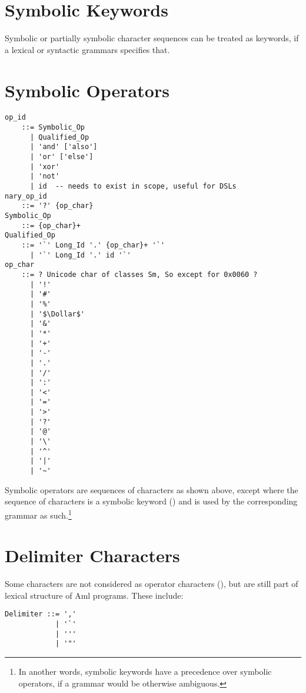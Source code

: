 \section{Symbolic Keywords}
\label{sec:symbolic-keywords}

Symbolic or partially symbolic character sequences can be treated as keywords, if a lexical or syntactic grammars specifies that.





\section{Symbolic Operators}
\label{sec:symbolic-operators}

\syntax\begin{lstlisting}[deletekeywords={of,for}]
op_id 
    ::= Symbolic_Op
      | Qualified_Op
      | 'and' ['also']
      | 'or' ['else']
      | 'xor'
      | 'not'
      | id  -- needs to exist in scope, useful for DSLs
nary_op_id 
    ::= '?' {op_char}
Symbolic_Op  
    ::= {op_char}+
Qualified_Op 
    ::= '`' Long_Id '.' {op_char}+ '`'
      | '`' Long_Id '.' id '`'
op_char 
    ::= ? Unicode char of classes Sm, So except for 0x0060 ?
      | '!'
      | '#'
      | '%'
      | '$\Dollar$'
      | '&'
      | '*'
      | '+'
      | '-'
      | '.'
      | '/'
      | ':'
      | '<'
      | '='
      | '>'
      | '?'
      | '@'
      | '\'
      | '^'
      | '|'
      | '~'
\end{lstlisting}

Symbolic operators are sequences of characters as shown above, except where the sequence of characters is a symbolic keyword () and is used by the corresponding grammar as such.\footnote{In another words, symbolic keywords have a precedence over symbolic operators, if a grammar would be otherwise ambiguous.}





\section{Delimiter Characters}
\label{sec:delimiter-characters}

Some characters are not considered as operator characters (), but are still part of lexical structure of Aml programs. These include:

\syntax\begin{lstlisting}[deletekeywords={of}]
Delimiter ::= ','
            | '`'  
            | ''' 
            | '"'
\end{lstlisting}

